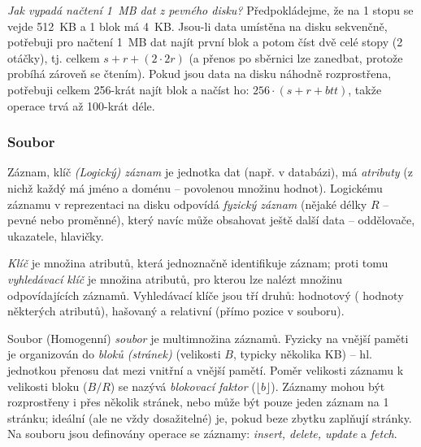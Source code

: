 \begin{priklad}
\emph{Jak vypadá načtení 1~MB dat z pevného disku?} Předpokládejme, že na 1 stopu se vejde 512~KB a 1 blok má 4~KB. Jsou-li data umístěna na disku sekvenčně, potřebuji pro načtení 1~MB dat najít první blok a potom číst dvě celé stopy (2 otáčky), tj. celkem $s+r+(2\cdot2r)$ (a přenos po sběrnici lze zanedbat, protože probíhá zároveň se čtením). Pokud jsou data na disku náhodně rozprostřena, potřebuji celkem 256-krát najít blok a načíst ho: $256\cdot(s+r+btt)$, takže operace trvá až 100-krát déle.
\end{priklad}


\subsubsection*{Soubor}

\begin{definiceN}{Záznam, klíč}
\emph{(Logický) záznam} je jednotka dat (např. v databázi), má \emph{atributy} (z nichž každý má jméno a doménu -- povolenou množinu hodnot). Logickému záznamu v reprezentaci na disku odpovídá \emph{fyzický záznam} (nějaké délky $R$ -- pevné nebo proměnné), který navíc může obsahovat ještě další data -- oddělovače, ukazatele, hlavičky. 

\emph{Klíč} je množina atributů, která jednoznačně identifikuje záznam; proti tomu \emph{vyhledávací klíč} je množina atributů, pro kterou lze nalézt množinu odpovídajících záznamů. Vyhledávací klíče jsou tří druhů: hodnotový ( hodnoty některých atributů), hašovaný a relativní (přímo pozice v souboru).
\end{definiceN}

\begin{definiceN}{Soubor}
(Homogenní) \emph{soubor} je multimnožina záznamů. Fyzicky na vnější paměti je organizován do \emph{bloků (stránek)} (velikosti $B$, typicky několika KB) -- hl. jednotkou přenosu dat mezi vnitřní a vnější pamětí. Poměr velikosti záznamu k velikosti bloku ($B/R$) se nazývá \emph{blokovací faktor} ($\lfloor b\rfloor$). Záznamy mohou být rozprostřeny i přes několik stránek, nebo může být pouze jeden záznam na 1 stránku; ideální (ale ne vždy dosažitelné) je, pokud beze zbytku zaplňují stránky. Na souboru jsou definovány operace se záznamy: \emph{insert, delete, update} a \emph{fetch}.
\end{definiceN}

